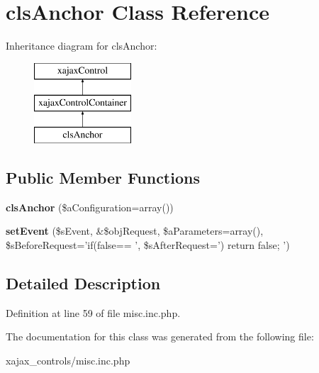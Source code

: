 \hypertarget{classclsAnchor}{
\section{clsAnchor Class Reference}
\label{classclsAnchor}
}
Inheritance diagram for clsAnchor:\begin{figure}[H]
\begin{center}
\leavevmode
\includegraphics[height=3.000000cm]{classclsAnchor}
\end{center}
\end{figure}
\subsection*{Public Member Functions}
\begin{DoxyCompactItemize}
\item 
\hypertarget{classclsAnchor_afda4ead2464497746bb4b5386be8727e}{
{\bfseries clsAnchor} (\$aConfiguration=array())}
\label{classclsAnchor_afda4ead2464497746bb4b5386be8727e}

\item 
\hypertarget{classclsAnchor_af5fe6e3e462c93bf005aa40b868d48d7}{
{\bfseries setEvent} (\$sEvent, \&\$objRequest, \$aParameters=array(), \$sBeforeRequest='if(false== ', \$sAfterRequest=') return false; ')}
\label{classclsAnchor_af5fe6e3e462c93bf005aa40b868d48d7}

\end{DoxyCompactItemize}


\subsection{Detailed Description}


Definition at line 59 of file misc.inc.php.



The documentation for this class was generated from the following file:\begin{DoxyCompactItemize}
\item 
xajax\_\-controls/misc.inc.php\end{DoxyCompactItemize}
